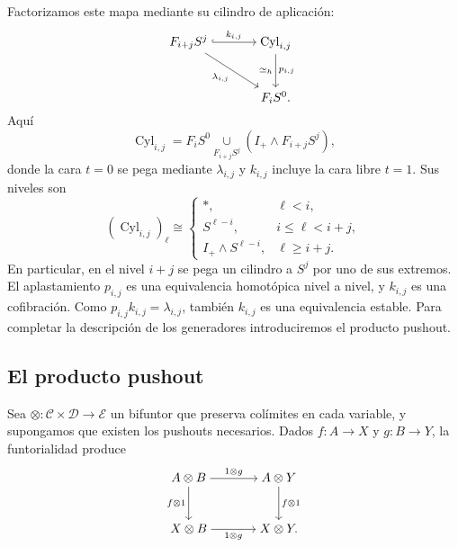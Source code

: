 Factorizamos este mapa mediante su cilindro de aplicación:
\[
\begin{tikzcd}[cramped,column sep=large,row sep=large]
F_{i+j}S^j \arrow[r,hook,"k_{i,j}"] \arrow[dr,"\lambda_{i,j}"']
& \operatorname{Cyl}_{i,j} \arrow[d,"p_{i,j}","\simeq_h"']\\
& F_iS^0.
\end{tikzcd}
\]
Aquí
\[
\operatorname{Cyl}_{i,j}
=F_iS^0\underset{F_{i+j}S^j}{\cup}
(I_+\wedge F_{i+j}S^j),
\]
donde la cara $t=0$ se pega mediante $\lambda_{i,j}$ y $k_{i,j}$ incluye la cara libre $t=1$. Sus niveles son
\[
(\operatorname{Cyl}_{i,j})_\ell\cong
\begin{cases}
*,&\ell<i,\\
S^{\ell-i},&i\le\ell<i+j,\\
I_+\wedge S^{\ell-i},&\ell\ge i+j.
\end{cases}
\]
En particular, en el nivel $i+j$ se pega un cilindro a $S^j$ por uno de sus extremos. El aplastamiento $p_{i,j}$ es una equivalencia homotópica nivel a nivel, y $k_{i,j}$ es una cofibración. Como $p_{i,j}k_{i,j}=\lambda_{i,j}$, también $k_{i,j}$ es una equivalencia estable. Para completar la descripción de los generadores introduciremos el producto pushout.

\subsection{El producto pushout}

Sea $\otimes\colon\mathcal C\times\mathcal D\to\mathcal E$ un bifuntor que preserva colímites en cada variable, y supongamos que existen los pushouts necesarios. Dados $f\colon A\to X$ y $g\colon B\to Y$, la funtorialidad produce
\[
\begin{tikzcd}[cramped,column sep=large,row sep=large]
A\otimes B \arrow[r,"1\otimes g"] \arrow[d,"f\otimes1"']
& A\otimes Y \arrow[d,"f\otimes1"]\\
X\otimes B \arrow[r,"1\otimes g"'] & X\otimes Y.
\end{tikzcd}
\]

